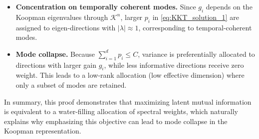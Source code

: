 \documentclass{article} %
\begin{document}
\begin{proofwithframe}
\begin{itemize}
\item \textbf{Concentration on temporally coherent modes.} Since $g_i$ depends on the Koopman eigenvalues through $\mathcal{K}^n$, larger $p_i$ in \eqref{eq:KKT_solution_1} are assigned to eigen-directions with $\lvert \lambda \rvert \approx 1$, corresponding to temporal-coherent modes. 
\item \textbf{Mode collapse.} Because $\sum_{i=1}^d p_i \leq C$, variance is preferentially allocated to directions with larger gain $g_i$, while less informative directions receive zero weight. This leads to a low-rank allocation (low effective dimension) where only a subset of modes are retained.
\end{itemize}
In summary, this proof demonstrates that maximizing latent mutual information is equivalent to a water-filling allocation of spectral weights, which naturally explains why emphasizing this objective can lead to mode collapse in the Koopman representation.
\end{proofwithframe}
\end{document}

